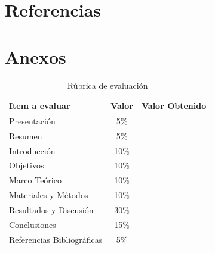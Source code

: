 \documentclass[letterpaper,12pt]{article}
\numberwithin{equation}{section}      %
\begin{document}
	\section{Referencias}
	\printbibliography
	
	\newpage
	\section{Anexos}
	
	\begin{table}[H]
		\centering
		\begin{tabular}{|l|c|c|}
			\hline
			\textbf{Item a evaluar} & \textbf{Valor} & \textbf{Valor Obtenido} \\
			\hline
			Presentación & 5\% & \\
			\hline
			Resumen & 5\% & \\
			\hline
			Introducción & 10\% & \\
			\hline
			Objetivos & 10\% & \\
			\hline
			Marco Teórico & 10\% & \\
			\hline
			Materiales y Métodos & 10\% & \\
			\hline
			Resultados y Discusión & 30\% & \\
			\hline
			Conclusiones & 15\% & \\
			\hline
			Referencias Bibliográficas & 5\% & \\
			\hline
		\end{tabular}
		\caption{Rúbrica de evaluación}
	\end{table}
	
\end{document}
